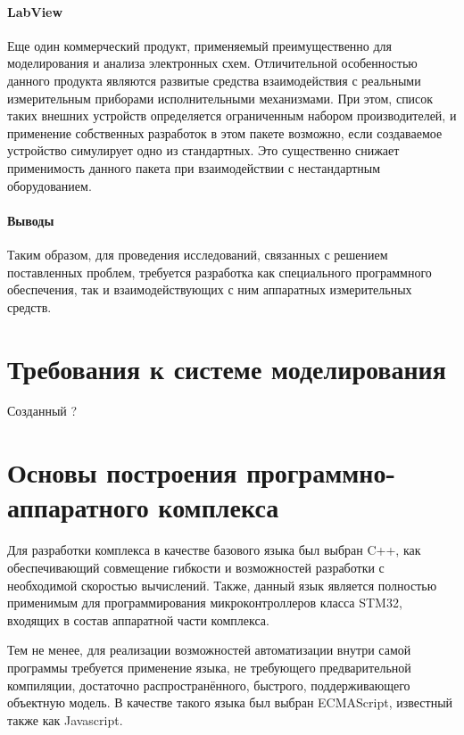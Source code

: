 \paragraph{LabView}

Еще один коммерческий продукт, применяемый преимущественно для
моделирования и анализа электронных схем. Отличительной особенностью
данного продукта являются развитые средства взаимодействия
с реальными измерительным приборами исполнительными механизмами.
При этом, список таких внешних устройств определяется
ограниченным набором производителей, и применение собственных
разработок в этом пакете возможно, если создаваемое устройство
симулирует одно из стандартных. Это существенно снижает применимость
данного пакета при взаимодействии с нестандартным оборудованием.



\paragraph{Выводы}

Таким образом, для проведения исследований, связанных с решением
поставленных проблем, требуется разработка как специального программного
обеспечения, так и взаимодействующих с ним аппаратных измерительных средств.




\section{Требования к системе моделирования} %

Созданный ?




\section{Основы построения программно-аппаратного комплекса} %

Для разработки комплекса в качестве базового языка был выбран C++,
как обеспечивающий совмещение гибкости и возможностей разработки
с необходимой скоростью вычислений. Также, данный язык
является полностью применимым для программирования микроконтроллеров
класса STM32, входящих в состав аппаратной части комплекса.

Тем не менее, для реализации возможностей автоматизации
внутри самой программы требуется применение языка,
не требующего предварительной компиляции, достаточно распространённого,
быстрого, поддерживающего объектную модель.
В качестве такого языка был выбран ECMAScript, известный также
как Javascript.

